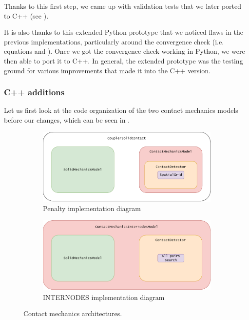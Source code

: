 \documentclass[11pt, a4paper]{article}
\begin{document}
Thanks to this first step, we came up with validation tests that we later ported to C++ (see ).

It is also thanks to this extended Python prototype that we noticed flaws in the previous implementations, particularly around the convergence check (i.e. equations  and ). Once we got the convergence check working in Python, we were then able to port it to C++. In general, the extended prototype was the testing ground for various improvements that made it into the C++ version.

\subsubsection{C++ additions}
\label{subsec:cppadditions}
Let us first look at the code organization of the two contact mechanics models before our changes, which can be seen in .

\begin{figure}[!htb]
\centering
\begin{subfigure}{.5\textwidth}
  \centering
  \includegraphics[width=0.95\linewidth]{figures/penalty_diagram.pdf}
  \caption{Penalty implementation diagram}
  \label{fig:penaltydiagram}
\end{subfigure}%
\begin{subfigure}{.5\textwidth}
  \centering
  \includegraphics[width=0.95\linewidth]{figures/internodes_diagram.pdf}
  \caption{INTERNODES implementation diagram}
  \label{fig:internodesdiagram}
\end{subfigure}
\caption{Contact mechanics architectures.}
\label{fig:contactdiagrams}
\end{figure}
\end{document}
